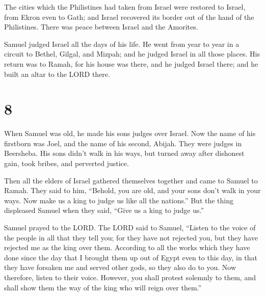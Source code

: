  The cities which the Philistines had taken from Israel
were restored to Israel, from Ekron even to Gath; and Israel recovered
its border out of the hand of the Philistines. There was peace between
Israel and the Amorites.

 Samuel judged Israel all the days of his life.
 He went from year to year in a circuit to Bethel, Gilgal,
and Mizpah; and he judged Israel in all those places.  His
return was to Ramah, for his house was there, and he judged Israel
there; and he built an altar to the LORD there.

\hypertarget{section-7}{%
\section{8}\label{section-7}}

 When Samuel was old, he made his sons judges over Israel.
 Now the name of his firstborn was Joel, and the name of his
second, Abijah. They were judges in Beersheba.  His sons
didn't walk in his ways, but turned away after dishonest gain, took
bribes, and perverted justice.

 Then all the elders of Israel gathered themselves together
and came to Samuel to Ramah.  They said to him, ``Behold,
you are old, and your sons don't walk in your ways. Now make us a king
to judge us like all the nations.''  But the thing
displeased Samuel when they said, ``Give us a king to judge us.''

Samuel prayed to the LORD.  The LORD said to Samuel,
``Listen to the voice of the people in all that they tell you; for they
have not rejected you, but they have rejected me as the king over them.
 According to all the works which they have done since the
day that I brought them up out of Egypt even to this day, in that they
have forsaken me and served other gods, so they also do to you.
 Now therefore, listen to their voice. However, you shall
protest solemnly to them, and shall show them the way of the king who
will reign over them.''

